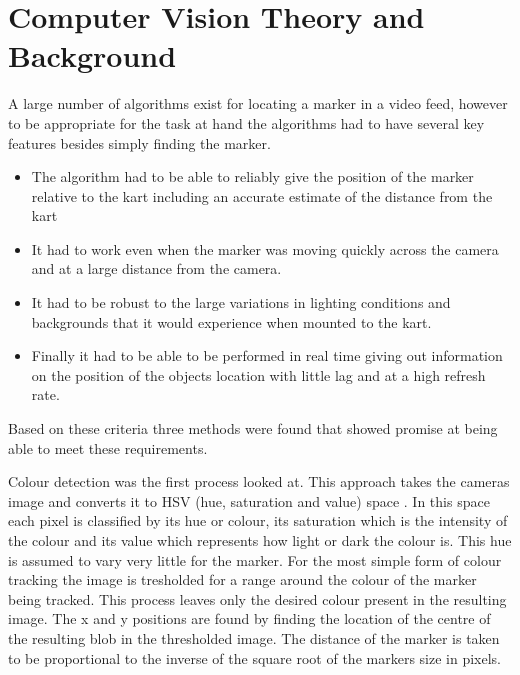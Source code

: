 \section{Computer Vision Theory and Background}

A large number of algorithms exist for locating a marker in a video feed, however to be appropriate for the task at hand the algorithms had to have several key features besides simply finding the marker. 

\begin{itemize}
\item The algorithm had to be able to reliably give the position of the marker relative to the kart including an accurate estimate of the distance from the kart
\item It had to work even when the marker was moving quickly across the camera and at a large distance from the camera. 
\item It had to be robust to the large variations in lighting conditions and backgrounds that it would experience when mounted to the kart. 
\item Finally it had to be able to be performed in real time giving out information on the position of the objects location with little lag and at a high refresh rate. 
\end{itemize}
Based on these criteria three methods were found that showed promise at being able to meet these requirements.

Colour detection was the first process looked at. This approach takes the cameras image and converts it to HSV (hue, saturation and value) space \cite{hsv}. In this space each pixel is classified by its hue or colour, its saturation which is the intensity of the colour and its value which represents how light or dark the colour is. This hue is assumed to vary very little for the marker. For the most simple form of colour tracking the image is tresholded for a range around the colour of the marker being tracked. This process leaves only the desired colour present in the resulting image. The x and y positions are found by finding the location of the centre of the resulting blob in the thresholded image. The distance of the marker is taken to be proportional to the inverse of the square root of the markers size in pixels.

